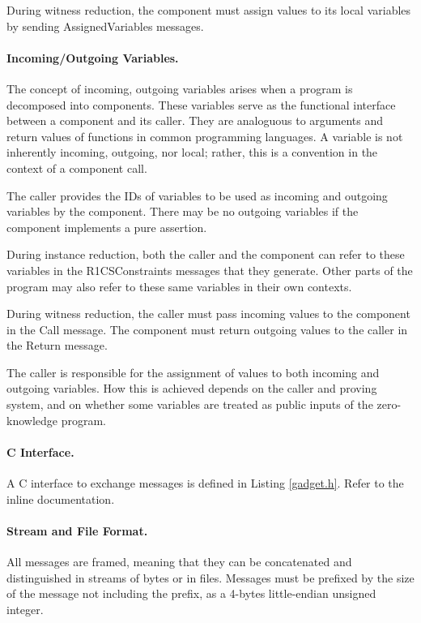 	During witness reduction, the component must assign values to its local variables
	by sending AssignedVariables messages.

\paragraph{Incoming/Outgoing Variables.}

	The concept of incoming, outgoing variables arises when a program is decomposed into components.
	These variables serve as the functional interface between a component and its caller.
	They are analoguous to arguments and return values of functions in common programming languages.
	A variable is not inherently incoming, outgoing, nor local;
	rather, this is a convention in the context of a component call.

	The caller provides the IDs of variables to be used as incoming and outgoing variables by the component.
	There may be no outgoing variables if the component implements a pure assertion.

	During instance reduction, both the caller and the component can refer to
	these variables in the R1CSConstraints messages that they generate.
	Other parts of the program may also refer to these same variables in their own contexts.

	During witness reduction, the caller must pass incoming values to the component in the Call message.
	The component must return outgoing values to the caller in the Return message.

	The caller is responsible for the assignment of values to both incoming and outgoing variables.
	How this is achieved depends on the caller and proving system,
	and on whether some variables are treated as public inputs of the zero-knowledge program.

\paragraph{C Interface.}

	A C interface to exchange messages is defined in Listing \ref{gadget.h}.
	Refer to the inline documentation.

\paragraph{Stream and File Format.}
	All messages are framed, meaning that they can be concatenated and distinguished in streams of bytes or in files.
	Messages must be prefixed by the size of the message not including the prefix,
	as a 4-bytes little-endian unsigned integer.
